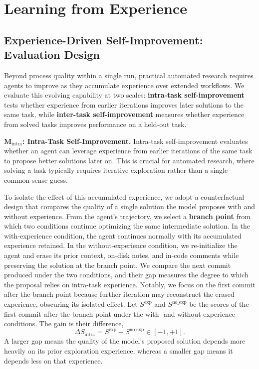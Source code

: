 \section{Learning from Experience}

\subsection{Experience-Driven Self-Improvement: Evaluation Design}
\label{self_improvement_evaluation}

Beyond process quality within a single run, practical automated research requires agents to improve as they accumulate experience over extended workflows.
We evaluate this evolving capability at two scales: \textbf{intra-task self-improvement} tests whether experience from earlier iterations improves later solutions to the same task, while \textbf{inter-task self-improvement} measures whether experience from solved tasks improves performance on a held-out task.

$\mathbf{M_{\mathrm{intra}}}$\textbf{: Intra-Task Self-Improvement.} Intra-task self-improvement evaluates whether an agent can leverage experience from earlier iterations of the same task to propose better solutions later on.
This is crucial for automated research, where solving a task typically requires iterative exploration rather than a single common-sense guess.

To isolate the effect of this accumulated experience, we adopt a counterfactual design that compares the quality of a single solution the model proposes with and without experience.
From the agent's trajectory, we select a \textbf{branch point} from which two conditions continue optimizing the same intermediate solution.
In the with-experience condition, the agent continues normally with its accumulated experience retained.
In the without-experience condition, we re-initialize the agent and erase its prior context, on-disk notes, and in-code comments while preserving the solution at the branch point.
We compare the next commit produced under the two conditions, and their gap measures the degree to which the proposal relies on intra-task experience.
Notably, we focus on the first commit after the branch point because further iteration may reconstruct the erased experience, obscuring its isolated effect.
Let $S^{\text{exp}}$ and $S^{\text{no\_exp}}$ be the scores of the first commit after the branch point under the with- and without-experience conditions.
The gain is their difference,
\[
    \Delta S_{\text{intra}} = S^{\text{exp}} - S^{\text{no\_exp}} \in [-1,+1].
\]
A larger gap means the quality of the model's proposed solution depends more heavily on its prior exploration experience, whereas a smaller gap means it depends less on that experience.

